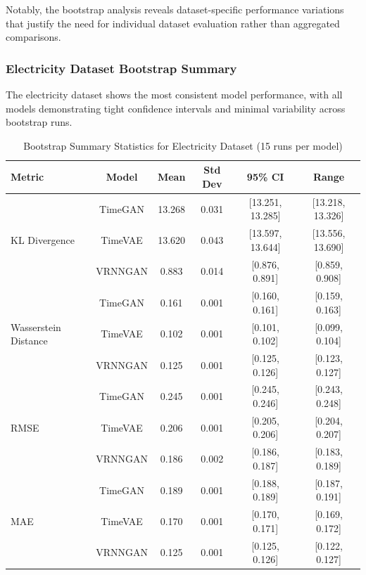 \documentclass{article}
\begin{document}
Notably, the bootstrap analysis reveals dataset-specific performance variations that justify the need for individual dataset evaluation rather than aggregated comparisons.
\subsubsection{Electricity Dataset Bootstrap Summary}
The electricity dataset shows the most consistent model performance, with all models demonstrating tight confidence intervals and minimal variability across bootstrap runs.

\begin{table}[H]
\centering
\caption{Bootstrap Summary Statistics for Electricity Dataset (15 runs per model)}
\label{tab:bootstrap_electricity}
\small
\begin{tabular}{lccccc}
\toprule
\textbf{Metric} & \textbf{Model} & \textbf{Mean} & \textbf{Std Dev} & \textbf{95\% CI} & \textbf{Range} \\
\midrule
\multirow{3}{*}{KL Divergence} 
    & TimeGAN   & 13.268 & 0.031 & [13.251, 13.285] & [13.218, 13.326] \\
    & TimeVAE   & 13.620 & 0.043 & [13.597, 13.644] & [13.556, 13.690] \\
    & VRNNGAN   & 0.883  & 0.014 & [0.876, 0.891]   & [0.859, 0.908] \\
\midrule
\multirow{3}{*}{Wasserstein Distance} 
    & TimeGAN   & 0.161 & 0.001 & [0.160, 0.161] & [0.159, 0.163] \\
    & TimeVAE   & 0.102 & 0.001 & [0.101, 0.102] & [0.099, 0.104] \\
    & VRNNGAN   & 0.125 & 0.001 & [0.125, 0.126] & [0.123, 0.127] \\
\midrule
\multirow{3}{*}{RMSE} 
    & TimeGAN   & 0.245 & 0.001 & [0.245, 0.246] & [0.243, 0.248] \\
    & TimeVAE   & 0.206 & 0.001 & [0.205, 0.206] & [0.204, 0.207] \\
    & VRNNGAN   & 0.186 & 0.002 & [0.186, 0.187] & [0.183, 0.189] \\
\midrule
\multirow{3}{*}{MAE} 
& TimeGAN   & 0.189 & 0.001 & [0.188, 0.189] & [0.187, 0.191] \\
& TimeVAE   & 0.170 & 0.001 & [0.170, 0.171] & [0.169, 0.172] \\
& VRNNGAN   & 0.125 & 0.001 & [0.125, 0.126] & [0.122, 0.127] \\
\bottomrule
\end{tabular}
\end{table}
\end{document}
